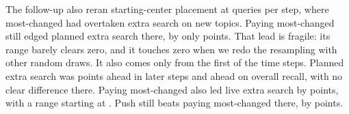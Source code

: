 The follow-up also reran starting-center placement at \RNumPlainQueriesHigh{} queries per step, where most-changed had overtaken extra search on new topics.
Paying most-changed still edged planned extra search there, by only \RNumPlainXFourESNewTopic{} points.
That lead is fragile: its range barely clears zero, and it touches zero when we redo the resampling with other random draws.
It also comes only from the first \RNumPlainXFourEarlySteps{} of the \RNumNumEpochs{} time steps.
Planned extra search was \RNumPlainXFourLateGap{} points ahead in later steps and \RNumPlainXFourOverallGap{} ahead on overall recall, with no clear difference there.
Paying most-changed also led live extra search by \RNumPlainXFourESONewTopic{} points, with a range starting at \RNumPlainXFourESONewTopicLow{}.
Push still beats paying most-changed there, by \RNumPlainXFourPVNewTopic{} points.
